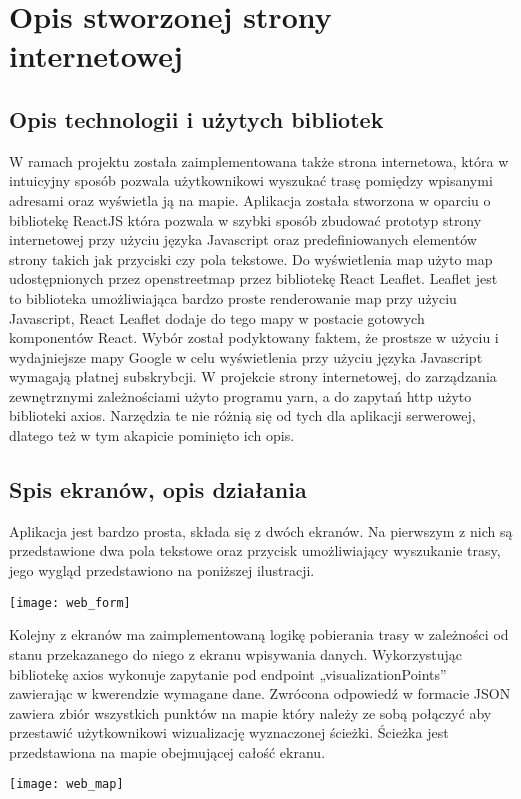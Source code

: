 \section{Opis stworzonej strony internetowej}

\subsection{Opis technologii i użytych bibliotek}

W ramach projektu została zaimplementowana także strona internetowa, która w intuicyjny sposób pozwala użytkownikowi wyszukać trasę pomiędzy wpisanymi adresami oraz wyświetla ją na mapie. 
Aplikacja została stworzona w oparciu o bibliotekę ReactJS która pozwala w szybki sposób zbudować prototyp strony internetowej przy użyciu języka Javascript oraz predefiniowanych elementów strony takich jak przyciski czy pola tekstowe. Do wyświetlenia map użyto map udostępnionych przez openstreetmap przez bibliotekę React Leaflet. Leaflet jest to biblioteka umożliwiająca bardzo proste renderowanie map przy użyciu Javascript, React Leaflet dodaje do tego mapy w postacie gotowych komponentów React. Wybór został podyktowany faktem, że prostsze w użyciu i wydajniejsze mapy Google w celu wyświetlenia przy użyciu języka Javascript wymagają płatnej subskrybcji.
W projekcie strony internetowej, do zarządzania zewnętrznymi zależnościami użyto programu yarn, a do zapytań http użyto biblioteki axios. Narzędzia te nie różnią się od tych dla aplikacji serwerowej, dlatego też w tym akapicie pominięto ich opis.

\subsection{Spis ekranów, opis działania}

Aplikacja jest bardzo prosta, składa się z dwóch ekranów. Na pierwszym z nich są przedstawione dwa pola tekstowe oraz przycisk umożliwiający wyszukanie trasy, jego wygląd przedstawiono na poniższej ilustracji.

\begin{center}
\texttt{[image: web\_form]}
\end{center}

Kolejny z ekranów ma zaimplementowaną logikę pobierania trasy w zależności od stanu przekazanego do niego z ekranu wpisywania danych. Wykorzystując bibliotekę axios wykonuje zapytanie pod endpoint „visualizationPoints” zawierając w kwerendzie wymagane dane. Zwrócona odpowiedź w formacie JSON zawiera zbiór wszystkich punktów na mapie który należy ze sobą połączyć aby przestawić użytkownikowi wizualizację wyznaczonej ścieżki. Ścieżka jest przedstawiona na mapie obejmującej całość ekranu.

\begin{center}
\texttt{[image: web\_map]}
\end{center}